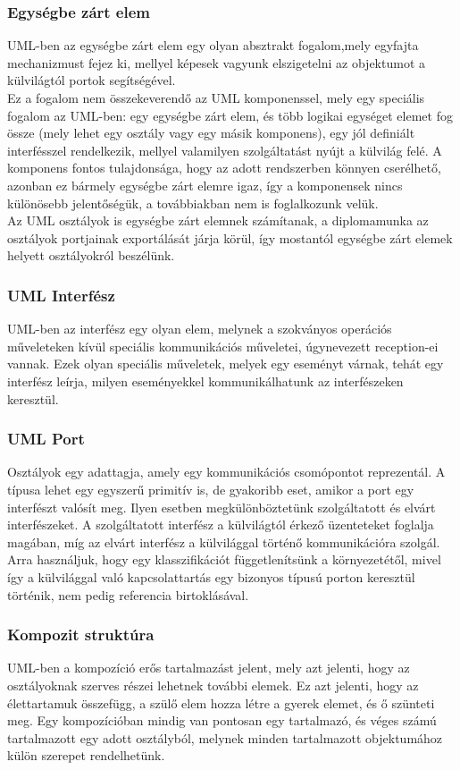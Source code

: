 \documentclass[a4paper,12pt]{report}
\begin{document}
\subsubsection{Egységbe zárt elem} \label{class}
UML-ben az egységbe zárt elem egy olyan absztrakt fogalom,mely egyfajta mechanizmust fejez ki, mellyel képesek vagyunk elszigetelni az objektumot a külvilágtól portok segítségével.\\ Ez a fogalom nem összekeverendő az UML komponenssel, mely egy speciális fogalom az UML-ben: egy egységbe zárt elem, és több logikai egységet elemet fog össze (mely lehet egy osztály vagy egy másik komponens), egy jól definiált interfésszel rendelkezik, mellyel valamilyen szolgáltatást nyújt a külvilág felé. A komponens fontos tulajdonsága, hogy az adott rendszerben könnyen cserélhető, azonban ez bármely egységbe zárt elemre igaz, így a komponensek nincs különösebb jelentőségük, a továbbiakban nem is foglalkozunk velük. \\
Az UML osztályok is egységbe zárt elemnek számítanak, a diplomamunka az osztályok portjainak exportálását járja körül, így mostantól egységbe zárt elemek helyett osztályokról beszélünk.
\subsubsection{UML Interfész}
UML-ben az interfész egy olyan elem, melynek a szokványos operációs műveleteken kívül speciális kommunikációs műveletei, úgynevezett reception-ei vannak. Ezek olyan speciális műveletek, melyek egy eseményt várnak, tehát egy interfész leírja, milyen eseményekkel kommunikálhatunk az interfészeken keresztül.
\subsubsection{UML Port}
Osztályok egy adattagja, amely egy kommunikációs csomópontot reprezentál. A típusa lehet egy egyszerű primitív is, de gyakoribb eset, amikor a port egy interfészt valósít meg. Ilyen esetben megkülönböztetünk szolgáltatott és elvárt interfészeket. A szolgáltatott interfész a külvilágtól érkező üzenteteket foglalja magában, míg az elvárt interfész a külvilággal történő kommunikációra szolgál. Arra használjuk, hogy egy klasszifikációt függetlenítsünk a környezetétől, mivel így a külvilággal való kapcsolattartás egy bizonyos típusú porton keresztül történik, nem pedig referencia birtoklásával.
\subsubsection{Kompozit struktúra}
UML-ben a kompozíció erős tartalmazást jelent, mely azt jelenti, hogy az osztályoknak szerves részei lehetnek további elemek. Ez azt jelenti, hogy az élettartamuk összefügg, a szülő elem hozza létre a gyerek elemet, és ő szünteti meg. Egy kompozícióban mindig van pontosan egy tartalmazó, és véges számú tartalmazott egy adott osztályból, melynek minden tartalmazott objektumához külön szerepet rendelhetünk.
\end{document}
